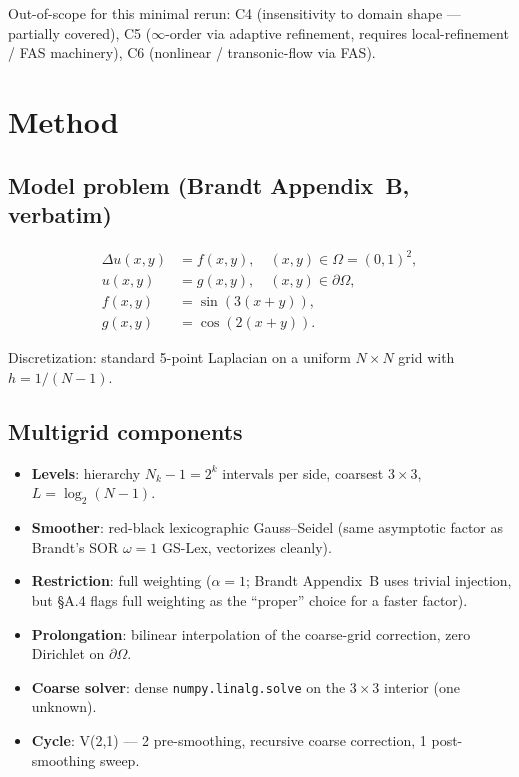 \documentclass[11pt]{article}
\begin{document}
Out-of-scope for this minimal rerun: C4 (insensitivity to domain shape --- partially covered), C5 ($\infty$-order via adaptive refinement, requires local-refinement / FAS machinery), C6 (nonlinear / transonic-flow via FAS).

\section{Method}

\subsection{Model problem (Brandt Appendix~B, verbatim)}
\begin{align}
\Delta u(x,y) &= f(x,y), \quad (x,y) \in \Omega = (0,1)^2, \\
u(x,y) &= g(x,y), \quad (x,y) \in \partial\Omega, \\
f(x,y) &= \sin(3(x+y)), \\
g(x,y) &= \cos(2(x+y)).
\end{align}

Discretization: standard 5-point Laplacian on a uniform $N \times N$ grid with $h = 1/(N-1)$.

\subsection{Multigrid components}
\begin{itemize}
\item \textbf{Levels}: hierarchy $N_k - 1 = 2^k$ intervals per side, coarsest $3 \times 3$, $L = \log_2(N-1)$.
\item \textbf{Smoother}: red-black lexicographic Gauss--Seidel (same asymptotic factor as Brandt's SOR $\omega=1$ GS-Lex, vectorizes cleanly).
\item \textbf{Restriction}: full weighting ($\alpha=1$; Brandt Appendix~B uses trivial injection, but \S A.4 flags full weighting as the ``proper'' choice for a faster factor).
\item \textbf{Prolongation}: bilinear interpolation of the coarse-grid correction, zero Dirichlet on $\partial\Omega$.
\item \textbf{Coarse solver}: dense \texttt{numpy.linalg.solve} on the $3 \times 3$ interior (one unknown).
\item \textbf{Cycle}: V(2,1) --- 2 pre-smoothing, recursive coarse correction, 1 post-smoothing sweep.
\end{itemize}
\end{document}
